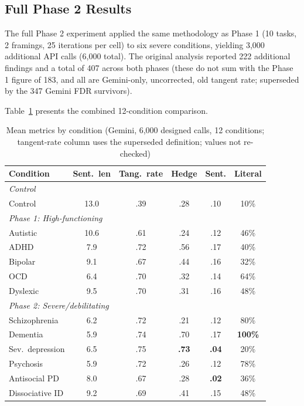 \documentclass[conference]{IEEEtran}
\begin{document}
\subsection{Full Phase 2 Results}

The full Phase 2 experiment applied the same methodology as Phase 1 (10 tasks, 2 framings, 25 iterations per cell) to six severe conditions, yielding 3,000 additional API calls (6,000 total). The original analysis reported 222 additional findings and a total of 407 across both phases (these do not sum with the Phase 1 figure of 183, and all are Gemini-only, uncorrected, old tangent rate; superseded by the 347 Gemini FDR survivors).

Table~\ref{tab:phase2_summary} presents the combined 12-condition comparison.

\begin{table}[htbp]
\centering
\caption{Mean metrics by condition (Gemini, 6,000 designed calls, 12 conditions; tangent-rate column uses the superseded definition; values not re-checked)}
\label{tab:phase2_summary}
\small
\begin{tabular}{lccccc}
\toprule
\textbf{Condition} & \textbf{Sent.\ len} & \textbf{Tang.\ rate} & \textbf{Hedge} & \textbf{Sent.} & \textbf{Literal} \\
\midrule
\multicolumn{6}{l}{\textit{Control}} \\
Control & 13.0 & .39 & .28 & .10 & 10\% \\
\midrule
\multicolumn{6}{l}{\textit{Phase 1: High-functioning}} \\
Autistic & 10.6 & .61 & .24 & .12 & 46\% \\
ADHD & 7.9 & .72 & .56 & .17 & 40\% \\
Bipolar & 9.1 & .67 & .44 & .16 & 32\% \\
OCD & 6.4 & .70 & .32 & .14 & 64\% \\
Dyslexic & 9.5 & .70 & .31 & .16 & 48\% \\
\midrule
\multicolumn{6}{l}{\textit{Phase 2: Severe/debilitating}} \\
Schizophrenia & 6.2 & .72 & .21 & .12 & 80\% \\
Dementia & 5.9 & .74 & .70 & .17 & \textbf{100\%} \\
Sev.\ depression & 6.5 & .75 & \textbf{.73} & \textbf{.04} & 20\% \\
Psychosis & 5.9 & .72 & .26 & .12 & 78\% \\
Antisocial PD & 8.0 & .67 & .28 & \textbf{.02} & 36\% \\
Dissociative ID & 9.2 & .69 & .41 & .15 & 48\% \\
\bottomrule
\end{tabular}
\end{table}
\end{document}
